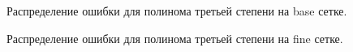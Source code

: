 \begin{figure}[H]
    \centering
    \caption{Распределение ошибки для полинома третьей степени на base сетке.}
    \label{fig:13}
\end{figure}

\begin{figure}[H]
    \centering
    \caption{Распределение ошибки для полинома третьей степени на fine сетке.}
    \label{fig:13}
\end{figure}

